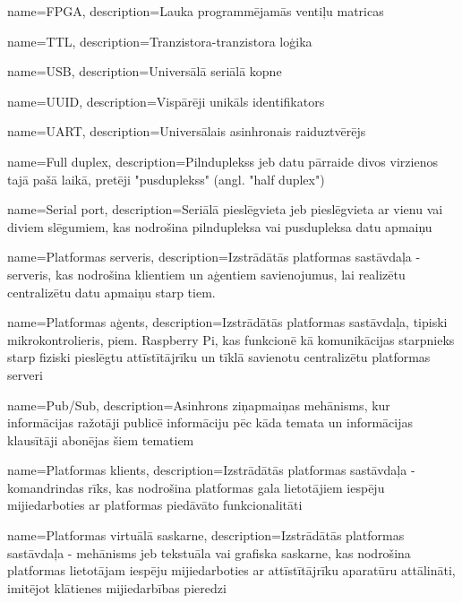 \makeglossaries

{
    name=FPGA,
    description={Lauka programmējamās ventiļu matricas}
}

{
    name=TTL,
    description={Tranzistora-tranzistora loģika}
}

{
    name=USB,
    description={Universālā seriālā kopne}
}

{
    name=UUID,
    description={Vispārēji unikāls identifikators}
}

{
    name=UART,
    description={Universālais asinhronais raiduztvērējs}
}

{
    name=Full duplex,
    description={Pilnduplekss jeb datu pārraide divos virzienos tajā pašā laikā, pretēji "pusduplekss" (angl. "half duplex")}
}

{
    name=Serial port,
    description={Seriālā pieslēgvieta jeb pieslēgvieta ar vienu vai diviem slēgumiem, kas nodrošina pilndupleksa 
        vai pusdupleksa datu apmaiņu}
}

{
    name=Platformas serveris,
    description={Izstrādātās platformas sastāvdaļa - serveris, kas nodrošina klientiem un aģentiem savienojumus, 
        lai realizētu centralizētu datu apmaiņu starp tiem.}
}

{
    name=Platformas aģents,
    description={Izstrādātās platformas sastāvdaļa, tipiski mikrokontrolieris, piem. Raspberry Pi, kas 
        funkcionē kā komunikācijas starpnieks starp fiziski pieslēgtu attīstītājrīku un tīklā 
        savienotu centralizētu platformas serveri}
}

{
    name=Pub/Sub,
    description={Asinhrons ziņapmaiņas mehānisms, kur informācijas ražotāji publicē informāciju pēc kāda temata 
        un informācijas klausītāji abonējas šiem tematiem}
}

{
    name=Platformas klients,
    description={Izstrādātās platformas sastāvdaļa - komandrindas rīks, kas nodrošina platformas gala lietotājiem
        iespēju mijiedarboties ar platformas piedāvāto funkcionalitāti}
}

{
    name=Platformas virtuālā saskarne,
    description={Izstrādātās platformas sastāvdaļa - mehānisms jeb tekstuāla vai grafiska saskarne, kas nodrošina 
        platformas lietotājam iespēju mijiedarboties ar attīstītājrīku aparatūru attālināti, imitējot klātienes 
        mijiedarbības pieredzi}
}

